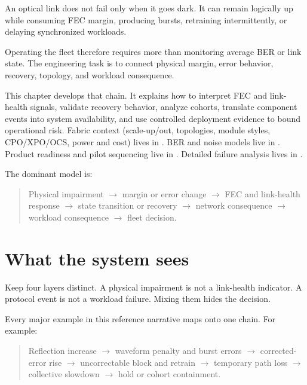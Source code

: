 

An optical link does not fail only when it goes dark. It can remain logically
up while consuming FEC margin, producing bursts, retraining intermittently, or
delaying synchronized workloads.

Operating the fleet therefore requires more than monitoring average BER or link
state. The engineering task is to connect physical margin, error behavior,
recovery, topology, and workload consequence.

This chapter develops that chain. It explains how to interpret FEC and
link-health signals, validate recovery behavior, analyze cohorts, translate
component events into system availability, and use controlled deployment
evidence to bound operational risk. Fabric context (scale-up/out, topologies,
module styles, CPO/XPO/OCS, power and cost) lives in
. BER and noise models live in
. Product readiness and pilot sequencing live in
. Detailed failure analysis lives in
.

The dominant model is:

\begin{quote}
\noindent Physical impairment
$\rightarrow$ margin or error change
$\rightarrow$ FEC and link-health response
$\rightarrow$ state transition or recovery
$\rightarrow$ network consequence
$\rightarrow$ workload consequence
$\rightarrow$ fleet decision.
\end{quote}

\section{What the system sees}
\label{sec:ops-what-system-sees}

Keep four layers distinct. A physical impairment is not a link-health
indicator. A protocol event is not a workload failure. Mixing them hides the
decision.

Every major example in this reference narrative maps onto one chain. For example:

\begin{quote}
\noindent Reflection increase
$\rightarrow$ waveform penalty and burst errors
$\rightarrow$ corrected-error rise
$\rightarrow$ uncorrectable block and retrain
$\rightarrow$ temporary path loss
$\rightarrow$ collective slowdown
$\rightarrow$ hold or cohort containment.
\end{quote}

